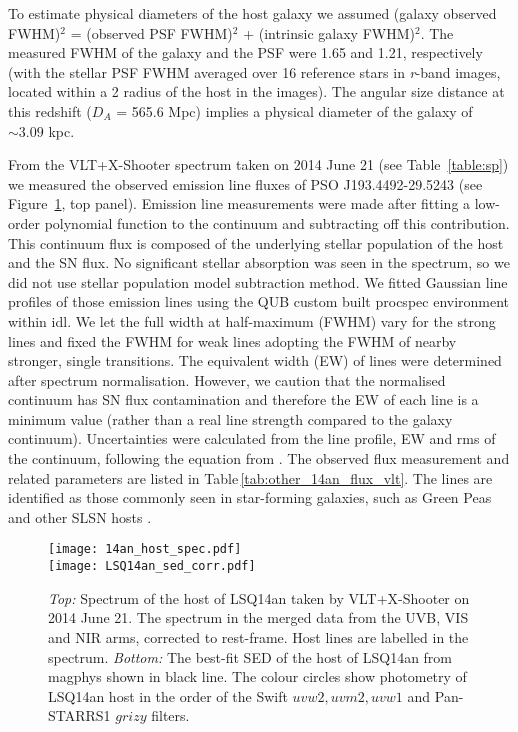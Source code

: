 \documentclass[useAMS,usenatbib]{mn2e}
\begin{document}
To estimate physical diameters of the host galaxy we assumed (galaxy observed FWHM)$^{2}$ = (observed PSF FWHM)$^{2}$ + (intrinsic galaxy FWHM)$^{2}$. The measured FWHM of the galaxy and the PSF were 1.65\arcsec\/ and 
1.21\arcsec\/, respectively (with the stellar PSF FWHM averaged over 16 reference stars in {\it r}-band images, located within a 2\arcmin\/ radius of the host in the images). The angular size distance at this redshift ({\rm $D_{A}$} = 565.6 Mpc) 
implies a physical diameter of the galaxy of $\sim 3.09$ kpc.

From the VLT+X-Shooter spectrum taken on 2014 June 21 (see Table~\ref{table:sp}) we measured the observed emission line fluxes of  PSO J193.4492-29.5243 (see Figure~\ref{fig:hostsed}, top panel).
Emission line measurements were made after fitting a low-order polynomial function to the continuum and subtracting off this contribution. This continuum flux is composed of the underlying stellar population of the host and the SN flux. No significant stellar absorption was seen in the spectrum, so we did not use stellar population model subtraction method. We fitted Gaussian line profiles of those emission lines using the QUB custom built {\sc procspec} environment within {\sc idl}. We let the full width at half-maximum (FWHM) vary for the strong lines and fixed the FWHM for weak lines adopting the FWHM of nearby stronger, single transitions. The equivalent width (EW) of lines were determined after spectrum normalisation. However, 
we caution that  the normalised continuum has  SN flux contamination and therefore the EW of each line is a minimum value
(rather than a real line strength compared to the galaxy continuum). 
Uncertainties were calculated from the line profile, EW and rms of the continuum, following the equation from \citet{1994ApJ...437..239G}. The observed flux measurement and related parameters are listed in Table\,\ref{tab:other_14an_flux_vlt}. The
 lines are identified as those commonly seen in star-forming galaxies, such as Green Peas \citep[e.g.][]{2012ApJ...749..185A}
and other SLSN hosts \citep[e.g. see][for a comprehensive line list for the host of PTF12dam]{ch15}.

\begin{figure}
\texttt{[image: 14an\_host\_spec.pdf]}\\
\texttt{[image: LSQ14an\_sed\_corr.pdf]}
\caption{{\it Top:} Spectrum of the host of LSQ14an taken by VLT+X-Shooter on 2014 June 21. The spectrum in the merged data from the UVB, VIS and NIR arms, corrected to rest-frame. Host lines are labelled in the spectrum. {\it Bottom:} The best-fit SED of the host of LSQ14an from {\sc magphys} \citep{2008MNRAS.388.1595D} shown in black line. The colour circles show photometry of LSQ14an host in the order of the Swift $uvw2, uvm2, uvw1$ and Pan-STARRS1 $grizy$ filters.}
\label{fig:hostsed}
\end{figure}
\end{document}
